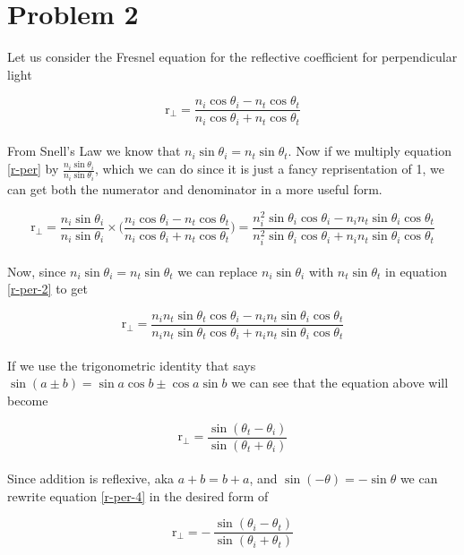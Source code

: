 	\section*{Problem 2}
	
	Let us consider the Fresnel equation for the reflective coefficient for perpendicular light
	
	\begin{equation} \label{r-per}
		\mathrm{r}_{\bot} = 
		\dfrac{n_i \cos \theta_i - n_t \cos \theta_t}{n_i \cos \theta_i + n_t \cos \theta_t}
	\end{equation}
	\\
	From Snell's Law we know that $n_i \sin \theta_i = n_t \sin \theta_t$. Now if we multiply equation 
	\ref{r-per} by $ \frac{n_i \sin \theta_i}{n_i \sin \theta_i} $, which we can do since it is just a fancy 
	reprisentation of 1, we can get both the numerator and denominator in a more useful form. 
	
	\begin{equation} \label{r-per-2}
		\mathrm{r}_{\bot} = \dfrac{n_i \sin \theta_i}{n_i \sin \theta_i} \times \Big(
		\dfrac{n_i \cos \theta_i - n_t \cos \theta_t}{n_i \cos \theta_i + n_t \cos \theta_t} \Big) = 
		\dfrac{n^2_i \sin \theta_i \cos \theta_i - n_i n_t \sin \theta_i \cos \theta_t}
		{n^2_i \sin \theta_i \cos \theta_i + n_i n_t \sin \theta_i \cos \theta_t}
	\end{equation}
	\\
	Now, since $n_i \sin \theta_i = n_t \sin \theta_t$ we can replace $n_i \sin \theta_i$ with $n_t \sin \theta_t$ in equation \ref{r-per-2} to get 
	
	\begin{equation}
		\mathrm{r}_{\bot} = 
		\dfrac{n_i n_t \sin \theta_t \cos \theta_i - n_i n_t \sin \theta_i \cos \theta_t}
		{n_i n_t \sin \theta_t \cos \theta_i + n_i n_t \sin \theta_i \cos \theta_t}
	\end{equation}
	\\
	If we use the trigonometric identity that says $\sin(a \pm b) = \sin a \cos b \pm \cos a \sin b$ we can see
	that the equation above will become 
	
	\begin{equation} \label{r-per-4}
		\mathrm{r}_{\bot} = 
		\dfrac{\sin(\theta_t - \theta_i)}{\sin(\theta_t + \theta_i)}
	\end{equation}
	\\
	Since addition is reflexive, aka $a + b = b + a$, and $\sin(-\theta) = - \sin{\theta}$ we can rewrite 
	equation \ref{r-per-4} in the desired form of 
	
	\begin{equation*}
		\mathrm{r}_{\bot} = 
		- \,\dfrac{\sin(\theta_i - \theta_t)}{\sin(\theta_i + \theta_t)}
	\end{equation*}
